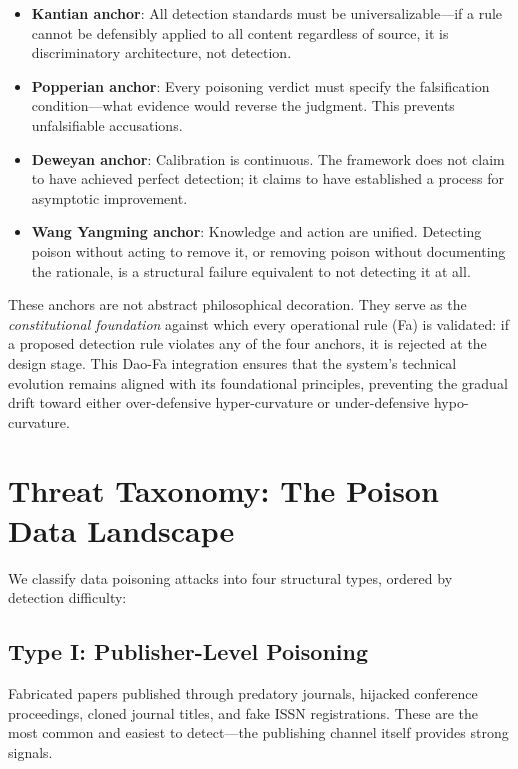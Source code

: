 \documentclass[11pt]{article}
\begin{document}
\begin{itemize}
  \item \textbf{Kantian anchor}: All detection standards must be universalizable---if 
    a rule cannot be defensibly applied to all content regardless of source, it 
    is discriminatory architecture, not detection.
  \item \textbf{Popperian anchor}: Every poisoning verdict must specify the 
    falsification condition---what evidence would reverse the judgment. This 
    prevents unfalsifiable accusations.
  \item \textbf{Deweyan anchor}: Calibration is continuous. The framework does not 
    claim to have achieved perfect detection; it claims to have established a 
    process for asymptotic improvement.
  \item \textbf{Wang Yangming anchor}: Knowledge and action are unified. Detecting 
    poison without acting to remove it, or removing poison without documenting 
    the rationale, is a structural failure equivalent to not detecting it at all.
\end{itemize}

These anchors are not abstract philosophical decoration. They serve as the 
\textit{constitutional foundation} against which every operational rule (Fa) is 
validated: if a proposed detection rule violates any of the four anchors, it is 
rejected at the design stage. This Dao-Fa integration ensures that the system's 
technical evolution remains aligned with its foundational principles, preventing the 
gradual drift toward either over-defensive hyper-curvature or under-defensive 
hypo-curvature.

\section{Threat Taxonomy: The Poison Data Landscape}

We classify data poisoning attacks into four structural types, ordered by detection 
difficulty:

\subsection{Type I: Publisher-Level Poisoning}
Fabricated papers published through predatory journals, hijacked conference proceedings, 
cloned journal titles, and fake ISSN registrations. These are the most common and easiest 
to detect---the publishing channel itself provides strong signals.
\end{document}
